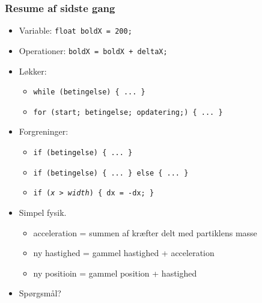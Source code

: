 \documentclass{beamer}
\begin{document}
\begin{frame}[fragile]
  \frametitle{Resume af sidste gang}
  
  \begin{itemize}
  \item Variable: \texttt{float boldX = 200;}\\
  \item Operationer: \texttt{boldX = boldX + deltaX;}\\
  \item Løkker:
    \begin{itemize}
    \item \texttt{while (betingelse) \{ ... \}}\\
    \item \texttt{for (start; betingelse; opdatering;) \{ ... \}}\\
    \end{itemize}
  \item Forgreninger: 
    \begin{itemize}
    \item \texttt{if (betingelse) \{ ... \}}\\
    \item \texttt{if (betingelse) \{ ... \} else \{ ... \}}\\
    \item \texttt{if (\emph{x > width}) \{ dx = -dx; \}}\\
    \end{itemize}
  \item Simpel fysik.
    \begin{itemize}
    \item acceleration = summen af kræfter delt med partiklens masse
    \item ny hastighed = gammel hastighed + acceleration
    \item ny positioin = gammel position + hastighed
    \end{itemize}
  \item Spørgsmål?
  \end{itemize}  
\end{frame}
\end{document}
